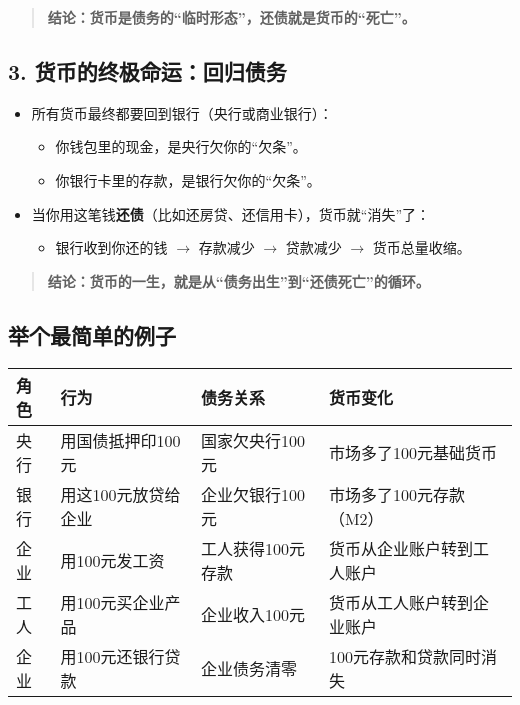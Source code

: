 \begin{quote}
\textbf{结论：货币是债务的“临时形态”，还债就是货币的“死亡”。}
\end{quote}

\subsection*{3. 货币的终极命运：回归债务}

\begin{itemize}[nosep]
  \item 所有货币最终都要回到银行（央行或商业银行）：
  \begin{itemize}
    \item 你钱包里的现金，是央行欠你的“欠条”。
    \item 你银行卡里的存款，是银行欠你的“欠条”。
  \end{itemize}
  \item 当你用这笔钱\textbf{还债}（比如还房贷、还信用卡），货币就“消失”了：
  \begin{itemize}
    \item 银行收到你还的钱 $\rightarrow$ 存款减少 $\rightarrow$ 贷款减少 $\rightarrow$ 货币总量收缩。
  \end{itemize}
\end{itemize}

\begin{quote}
\textbf{结论：货币的一生，就是从“债务出生”到“还债死亡”的循环。}
\end{quote}

\subsection*{举个最简单的例子}

\begin{center}
\begin{longtable}{>{\raggedright\arraybackslash}p{1.0cm} >{\raggedright\arraybackslash}p{4.0cm} >{\raggedright\arraybackslash}p{4.0cm} >{\raggedright\arraybackslash}p{4.0cm}}
\toprule
\textbf{角色} & \textbf{行为} & \textbf{债务关系} & \textbf{货币变化} \\
\midrule
央行 & 用国债抵押印100元 & 国家欠央行100元 & 市场多了100元基础货币 \\
银行 & 用这100元放贷给企业 & 企业欠银行100元 & 市场多了100元存款（M2） \\
企业 & 用100元发工资 & 工人获得100元存款 & 货币从企业账户转到工人账户 \\
工人 & 用100元买企业产品 & 企业收入100元 & 货币从工人账户转到企业账户 \\
企业 & 用100元还银行贷款 & 企业债务清零 & 100元存款和贷款同时消失 \\
\bottomrule
\end{longtable}
\end{center}

